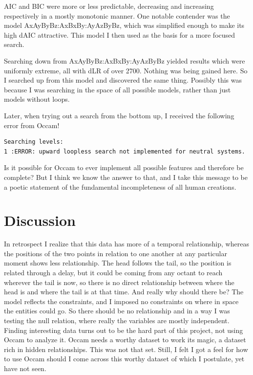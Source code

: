 \documentclass[11pt]{article}
\begin{document}
AIC and BIC were more or less predictable, decreasing and increasing respectively in a mostly monotonic manner.  One notable contender was the model AxAyByBz:AxBxBy:AyAzByBz, which was simplified enough to make its high dAIC attractive.  This model I then used as the basis for a more focused search.

Searching down from AxAyByBz:AxBxBy:AyAzByBz yielded results which were uniformly extreme, all with dLR of over 2700.  Nothing was being gained here.  So I searched up from this model and discovered the same thing.  Possibly this was because I was searching in the space of all possible models, rather than just models without loops.

Later, when trying out a search from the bottom up, I received the following error from Occam!

\begin{verbatim}
Searching levels:
1 :ERROR: upward loopless search not implemented for neutral systems.
\end{verbatim}

Is it possible for Occam to ever implement all possible features and therefore be complete?  But I think we know the answer to that, and I take this message to be a poetic statement of the fundamental incompleteness of all human creations.

\section{Discussion}

In retrospect I realize that this data has more of a temporal relationship, whereas the positions of the two points in relation to one another at any particular moment shows less relationship.  The head follows the tail, so the position is related through a delay, but it could be coming from any octant to reach wherever the tail is now, so there is no direct relationship between where the head is and where the tail is at that time.  And really why should there be?  The model reflects the constraints, and I imposed no constraints on where in space the entities could go.  So there should be no relationship and in a way I was testing the null relation, where really the variables are mostly independent.  Finding interesting data turns out to be the hard part of this project, not using Occam to analyze it.  Occam needs a worthy dataset to work its magic, a dataset rich in hidden relationships.  This was not that set.  Still, I felt I got a feel for how to use Occam should I come across this worthy dataset of which I postulate, yet have not seen.
\end{document}
